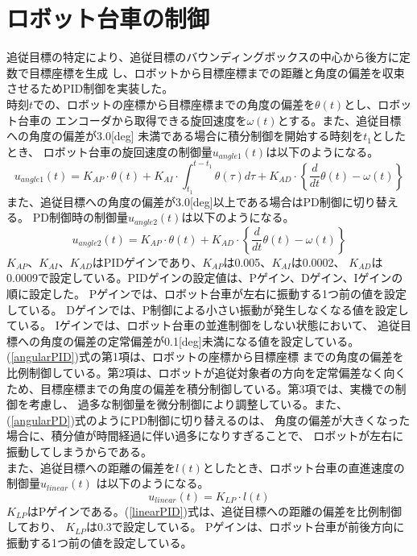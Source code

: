 \section{ロボット台車の制御}
追従目標の特定により、追従目標のバウンディングボックスの中心から後方に定数で目標座標を生成
し、ロボットから目標座標までの距離と角度の偏差を収束させるためPID制御を実装した。 \\ \indent
時刻$t$での、ロボットの座標から目標座標までの角度の偏差を$\theta(t)$とし、ロボット台車の
エンコーダから取得できる旋回速度を$\omega(t)$とする。また、追従目標への角度の偏差が3.0[deg]
未満である場合に積分制御を開始する時刻を$t_1$としたとき、
ロボット台車の旋回速度の制御量$u_{angle1}(t)$は以下のようになる。
\begin{equation}
\label{angularPID}
u_{angle1}(t) = K_{AP} \cdot \theta(t) + K_{AI} \cdot \int_{t_1}^{t-t_1} \theta(\tau) d\tau + K_{AD} \cdot \left\{ \frac{d}{dt} \theta(t) - \omega(t) \right\}
\end{equation}
また、追従目標への角度の偏差が3.0[deg]以上である場合はPD制御に切り替える。
PD制御時の制御量$u_{angle2}(t)$は以下のようになる。
\begin{equation}
\label{angularPD}
u_{angle2}(t) = K_{AP} \cdot \theta(t) + K_{AD} \cdot \left\{ \frac{d}{dt} \theta(t) - \omega(t) \right\}
\end{equation}
$K_{AP}$、$K_{AI}$、$K_{AD}$はPIDゲインであり、$K_{AP}$は0.005、$K_{AI}$は0.0002、
$K_{AD}$は0.0009で設定している。PIDゲインの設定値は、Pゲイン、Dゲイン、Iゲインの順に設定した。
Pゲインでは、ロボット台車が左右に振動する1つ前の値を設定している。
Dゲインでは、P制御による小さい振動が発生しなくなる値を設定している。
Iゲインでは、ロボット台車の並進制御をしない状態において、
追従目標への角度の偏差の定常偏差が0.1[deg]未満になる値を設定している。
(\ref{angularPID})式の第1項は、ロボットの座標から目標座標
までの角度の偏差を比例制御している。第2項は、ロボットが追従対象者の方向を定常偏差なく向く
ため、目標座標までの角度の偏差を積分制御している。第3項では、実機での制御を考慮し、
過多な制御量を微分制御により調整している。また、(\ref{angularPD})式のようにPD制御に切り替えるのは、
角度の偏差が大きくなった場合に、積分値が時間経過に伴い過多になりすぎることで、
ロボットが左右に振動してしまうからである。\\ \indent
また、追従目標への距離の偏差を$l(t)$としたとき、ロボット台車の直進速度の制御量$u_{linear}(t)$
は以下のようになる。
\begin{equation}
\label{linearPID}
u_{linear}(t) = K_{LP} \cdot l(t)
\end{equation}
$K_{LP}$はPゲインである。(\ref{linearPID})式は、追従目標への距離の偏差を比例制御しており、
$K_{LP}$は0.3で設定している。
Pゲインは、ロボット台車が前後方向に振動する1つ前の値を設定している。

